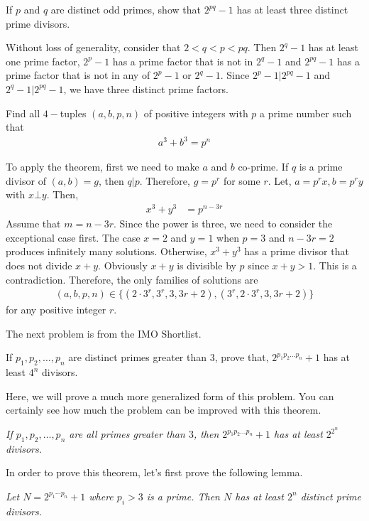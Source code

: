 \documentclass{subfile}
\begin{document}
		\begin{problem}
			If $p$ and $q$ are distinct odd primes, show that $2^{pq}-1$ has at least three distinct prime divisors.
		\end{problem}

		\begin{solution}
			Without loss of generality, consider that $2<q<p<pq$. Then $2^q-1$ has at least one prime factor, $2^p-1$ has a prime factor that is not in $2^q-1$ and $2^{pq}-1$ has a prime factor that is not in any of $2^p-1$ or $2^q-1$. Since $2^p-1|2^{pq}-1$ and $2^{q}-1|2^{pq}-1$, we have three distinct prime factors.
		\end{solution}


		\begin{problem}
			Find all $4-$tuples $(a,b,p,n)$ of positive integers with $p$ a prime number such that
				\begin{align*}
					a^3+b^3=p^n
				\end{align*}
		\end{problem}

		\begin{solution}
			To apply the theorem, first we need to make $a$ and $b$ co-prime. If $q$ is a prime divisor of $(a,b)=g$, then $q|p$. Therefore, $g=p^r$ for some $r$. Let, $a=p^rx,b=p^ry$ with $x\bot y$. Then,
				\begin{align*}
					x^3+y^3 & = p^{n-3r}
				\end{align*}
			Assume that $m=n-3r$. Since the power is three, we need to consider the exceptional case first. The case $x=2$ and $y=1$ when $p=3$ and $n-3r=2$ produces infinitely many solutions. Otherwise, $x^3+y^3$ has a prime divisor that does not divide $x+y$. Obviously $x+y$ is divisible by $p$ since $x+y>1$. This is a contradiction. Therefore, the only families of solutions are
				\begin{align*}
					(a,b,p,n)\in\{(2\cdot 3^r,3^r,3,3r+2),(3^r,2\cdot 3^r,3,3r+2)\}
				\end{align*}
			for any positive integer $r$.
		\end{solution}

	The next problem is from the IMO Shortlist.
		\begin{problem}
			If $p_1,p_2,\dots,p_n$ are distinct primes greater than $3$, prove that, $2^{p_1p_2\dots p_n}+1$ has at least $4^n$ divisors.
		\end{problem}
	Here, we will prove a much more generalized form of this problem.  You can certainly see how much the problem can be improved with this theorem.
		\begin{theorem}\slshape
			If $p_1,p_2,\dots,p_n$ are all primes greater than $3$, then $2^{p_1p_2\dots p_n}+1$ has at least $2^{2^n}$ divisors.
		\end{theorem}
	In order to prove this theorem, let's first prove the following lemma.
		\begin{lemma}\slshape
			Let $N=2^{p_1\cdots p_n}+1$ where $p_i>3$ is a prime. Then $N$ has at least $2^n$ distinct prime divisors.
		\end{lemma}
\end{document}
